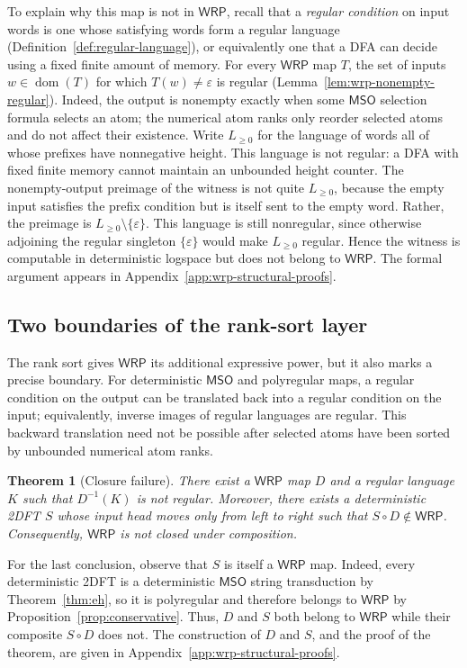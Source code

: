 \documentclass[11pt]{article}
\newtheorem{theorem}{Theorem}[section]
\theoremstyle{definition}
\newcommand{\WRP}{\mathsf{WRP}}
\newcommand{\MSO}{\mathsf{MSO}}
\begin{document}
To explain why this map is not in $\WRP$, recall that a \emph{regular
condition} on input words is one whose satisfying words form a regular
language (Definition~\ref{def:regular-language}), or equivalently one that a
DFA can decide using a fixed finite amount of memory.  For every $\WRP$ map
$T$, the set of inputs $w\in\operatorname{dom}(T)$ for which
$T(w)\ne\varepsilon$ is regular (Lemma~\ref{lem:wrp-nonempty-regular}).
Indeed, the output is nonempty exactly when some $\MSO$ selection formula
selects an atom; the numerical atom ranks only reorder selected atoms and do not
affect their existence.  Write $L_{\ge 0}$ for the language of words all of
whose prefixes have nonnegative height.  This language is not regular: a DFA
with fixed finite memory cannot maintain an unbounded height counter.  The
nonempty-output preimage of the witness is not quite $L_{\ge 0}$, because the
empty input satisfies the prefix condition but is itself sent to the empty
word.  Rather, the preimage is $L_{\ge 0}\setminus\{\varepsilon\}$.  This
language is still nonregular, since otherwise adjoining the regular singleton
$\{\varepsilon\}$ would make $L_{\ge 0}$ regular.  Hence the witness is
computable in deterministic logspace but does not belong to $\WRP$.  The
formal argument appears in
Appendix~\ref{app:wrp-structural-proofs}.

\subsection{Two boundaries of the rank-sort layer}

The rank sort gives $\WRP$ its additional expressive power, but it also marks
a precise boundary.  For deterministic $\MSO$ and polyregular maps, a regular
condition on the output can be translated back into a regular condition on the
input; equivalently, inverse images of regular languages are regular.  This
backward translation need not be possible after selected atoms have been sorted
by unbounded numerical atom ranks.

\begin{theorem}[Closure failure]
\label{thm:wrp-not-closed}
There exist a $\WRP$ map $D$ and a regular language $K$ such
that $D^{-1}(K)$ is not regular.  Moreover, there exists a deterministic
2DFT $S$ whose input head moves only from left to right such that
$S\circ D\notin\WRP$.  Consequently, $\WRP$ is not closed under composition.
\end{theorem}

For the last conclusion, observe that $S$ is itself a $\WRP$ map.  Indeed,
every deterministic 2DFT is a deterministic $\MSO$ string transduction by
Theorem~\ref{thm:eh}, so it is polyregular and therefore belongs to $\WRP$ by
Proposition~\ref{prop:conservative}.  Thus, $D$ and $S$ both belong to $\WRP$
while their composite $S\circ D$ does not.
The construction of $D$ and $S$, and the proof of the theorem, are given in
Appendix~\ref{app:wrp-structural-proofs}.
\end{document}
